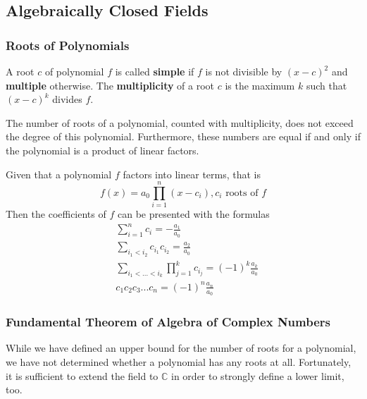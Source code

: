 \subsection{Algebraically Closed Fields}

  \subsubsection{Roots of Polynomials}

    \begin{definition}
      A root $c$ of polynomial $f$ is called \textbf{simple} if $f$ is not divisible by $(x-c)^2$ and \textbf{multiple} otherwise. The \textbf{multiplicity} of a root $c$ is the maximum $k$ such that $(x-c)^k$ divides $f$. 
    \end{definition}

    \begin{theorem}
      The number of roots of a polynomial, counted with multiplicity, does not exceed the degree of this polynomial. Furthermore, these numbers are equal if and only if the polynomial is a product of linear factors.
    \end{theorem}

    \begin{theorem}
      Given that a polynomial $f$ factors into linear terms, that is 
      \begin{equation}
        f(x) = a_0 \prod_{i = 1}^{n} (x - c_i), c_i \text{ roots of } f
      \end{equation}
      Then the coefficients of $f$ can be presented with the formulas
      \begin{align*}
        & \sum_{i=1}^n c_i = - \frac{a_1}{a_0} \\
        & \sum_{i_1 < i_2} c_{i_1} c_{i_2} = \frac{a_2}{a_0} \\
        & \sum_{i_1< ...< i_k} \prod_{j = 1}^{k} c_{i_j} = (-1)^k \frac{a_k}{a_0} \\
        & c_1 c_2 c_3 ... c_n = (-1)^n \frac{a_n}{a_0}
      \end{align*}
    \end{theorem}

  \subsubsection{Fundamental Theorem of Algebra of Complex Numbers}

    While we have defined an upper bound for the number of roots for a polynomial, we have not determined whether a polynomial has any roots at all. Fortunately, it is sufficient to extend the field to $\mathbb{C}$ in order to strongly define a lower limit, too. 

